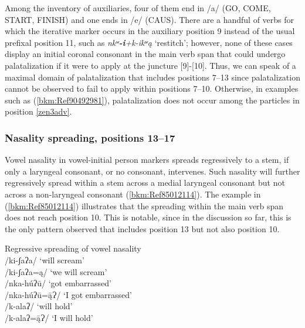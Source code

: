 \documentclass[output=paper]{langscibook}
\begin{document}
\label{bkm:Ref113308369}
Among the inventory of auxiliaries, four of them end in /a/ (GO, COME, START, FINISH) and one ends in /e/ (CAUS). There are a handful of verbs for which the iterative marker occurs in the auxiliary position 9 instead of the usual prefixal position 11, such as \textit{nkʷ}\textbf{\textit{\nobreakdash-i}}\textit{+k-ikʷą} `restitch'; however, none of these cases display an initial coronal consonant in the main verb span that could undergo palatalization if it were to apply at the juncture [9]-[10]. Thus, we can speak of a maximal domain of palatalization that includes positions 7{}--13 since palatalization cannot be observed to fail to apply within positions 7{}--10. Otherwise, in examples such as (\ref{bkm:Ref90492981}), palatalization does not occur among the particles in position \ref{zen3adv}.


\subsubsection{Nasality spreading, positions 13{}--17} 
\label{bkm:Ref113308377}
Vowel nasality in vowel-initial person markers spreads regressively to a stem, if only a laryngeal consonant, or no consonant, intervenes. Such nasality will further regressively spread within a stem across a medial laryngeal consonant but not across a non-laryngeal consonant (\ref{bkm:Ref85012114}). The example in (\ref{bkm:Ref85012114}) illustrates that the spreading within the main verb span does not reach position 10. This is notable, since in the discussion so far, this is the only pattern observed that includes position 13 but not also position 10.

\ea\label{bkm:Ref85012114}Regressive spreading of vowel nasality \\
\ea  /ki-ʃaʔa/  \rightarrow  [kiʃaʔa]   `will scream' \\ 
\ex /ki-ʃaʔa=ą/  \rightarrow  [kiʃãʔãã]   `we will scream' \\
\ex /nka-húʔū/  \rightarrow  [ŋɡahúʔū]  `got embarrassed' \\
\ex /nka-húʔū=ą̄Ɂ/     `I got embarrassed' \\
\ex /k-alaʔ/   \rightarrow [kalaʔ]    `will hold'  \\
\ex /k-alaʔ=ą̄Ɂ/    `I will hold'
\z 
\z 

\end{document}

